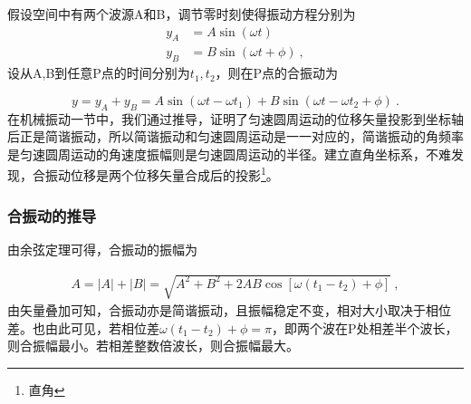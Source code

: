 假设空间中有两个波源A和B，调节零时刻使得振动方程分别为
\begin{equation}
\begin{aligned}
y_A&=A\sin(\omega t)\\
y_B&=B\sin (\omega t+\phi)~,
\end{aligned}
\end{equation}
设从A,B到任意P点的时间分别为$t_1,t_2$，则在P点的合振动为

\begin{equation}
y=y_A+y_B=A\sin(\omega t-\omega t_1)+B\sin(\omega t-\omega t_2+\phi)~.
\end{equation}
在机械振动一节中，我们通过推导，证明了匀速圆周运动的位移矢量投影到坐标轴后正是简谐振动，所以简谐振动和匀速圆周运动是一一对应的，简谐振动的角频率是匀速圆周运动的角速度振幅则是匀速圆周运动的半径。建立直角坐标系，不难发现，合振动位移是两个位移矢量合成后的投影\footnote{直角}。

\subsubsection{合振动的推导}
由余弦定理可得，合振动的振幅为

\begin{equation}
\begin{aligned}
A=|A|+|B|=\sqrt{A^2+B^2+2AB\cos[\omega(t_1-t_2)+\phi]}~,
\end{aligned}
\end{equation}
由矢量叠加可知，合振动亦是简谐振动，且振幅稳定不变，相对大小取决于相位差。也由此可见，若相位差$\omega(t_1-t_2)+\phi=\pi$，即两个波在P处相差半个波长，则合振幅最小。若相差整数倍波长，则合振幅最大。